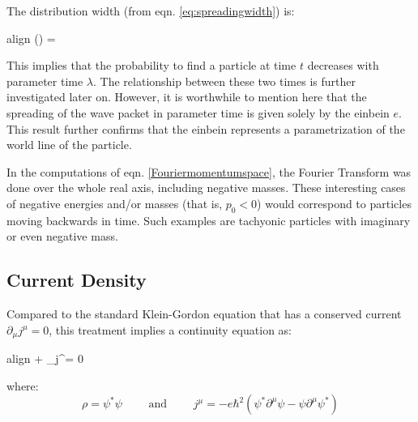 \documentclass[a4paper,10pt]{article}
\numberwithin{equation}{section}
\newcommand{\boxedeq}[2]{\begin{empheq}[box={\fboxsep=6pt\fbox}]{align}\label{#1}#2\end{empheq}}
\begin{document}
The distribution width (from eqn. \ref{eq:spreadingwidth}) is:
\boxedeq{eq:timegaussianwavepacket}{
    \sigma(\lambda) = \sqrt{\frac{1}{ \alpha} \left( \alpha^2 + \frac{e^2}{\hbar^2} \lambda^2\right)}
}

This implies that the probability to find a particle at time $t$ decreases with parameter time $\lambda$. The relationship between these two times is further investigated later on. However, it is worthwhile to mention here that the spreading of the wave packet in parameter time is given solely by the einbein $e$. This result further confirms that the einbein represents a parametrization of the world line of the particle.

In the computations of eqn. \ref{Fouriermomentumspace}, the Fourier Transform was done over the whole real axis, including negative masses. These interesting cases of negative energies and/or masses (that is, $p_0 <0$) would correspond to particles moving backwards in time. Such examples are tachyonic particles with imaginary or even negative mass. 

\subsection{Current Density}
\label{subseq:currentdensity}
Compared to the standard Klein-Gordon equation that has a conserved current $\partial_\mu j^\mu = 0$, this treatment implies a continuity equation as:
\boxedeq{eq:continuityeq}{
    \dot{\rho} + \partial_\mu j^\mu = 0
}
where:
\begin{equation}
    \rho = \psi^* \psi \qquad \text{ and } \qquad j^\mu = - e \hbar^2 ( \psi^* \partial^\mu \psi -  \psi \partial^\mu \psi^*)
\end{equation}
\end{document}
